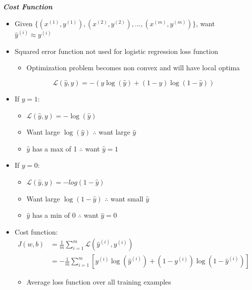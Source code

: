 \documentclass[12pt, letterpaper]{article}
\begin{document}
    \vspace{3mm}
    \textbf{\textit{Cost Function}}
    \begin{itemize}
        \item Given $\{(x^{(1)}, y^{(1)}),(x^{(2)}, y^{(2)}), ..., (x^{(m)}, y^{(m)})\}$, want $\hat{y}^{(i)} \approx y^{(i)}$
        \item Squared error function not used for logistic regression loss function 
        \begin{itemize}
            \item Optimization problem becomes non convex and will have local optima
        \end{itemize}

        \vspace{10mm}
        $$\mathcal{L}(\hat{y},y)=-(y\log(\hat{y})+(1-y)\log(1-\hat{y}))$$
        \item If $y=1$:
        \begin{itemize}
            \item $\mathcal{L}(\hat{y},y)=-\log(\hat{y})$
            \item Want large $\log(\hat{y})$ $\therefore$ want large $\hat{y}$
            \item $\hat{y}$ has a max of 1 $\therefore$ want $\hat{y}=1$
        \end{itemize}
        \item If $y=0$:
        \begin{itemize}
            \item $\mathcal{L}(\hat{y}, y)=-log(1-\hat{y})$
            \item Want large $\log(1-\hat{y})$ $\therefore$ want small $\hat{y}$
            \item $\hat{y}$ has a min of 0 $\therefore$ want $\hat{y}=0$
        \end{itemize}
        \item Cost function:
        \begin{align*}
            J(w,b)&=\frac{1}{m}\sum_{i=1}^{m}\mathcal{L}(\hat{y}^{(i)},y^{(i)}) \\
            &= -\frac{1}{m}\sum_{i=1}^{m}[y^{(i)}\log(\hat{y}^{(i)})+(1-y^{(i)})\log(1-\hat{y}^{(i)})]
        \end{align*}
        \begin{itemize}
            \item Average loss function over all training examples
        \end{itemize}
    \end{itemize}
\end{document}
